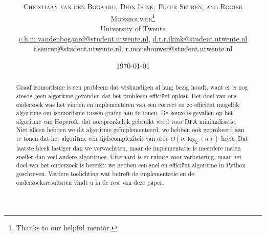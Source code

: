 \documentclass[twoside]{article}
\title{\vspace{-15mm}\fontsize{24pt}{10pt}\selectfont\textbf{\articletitle}} %
\author{
\large
\textsc{Christiaan van den Bogaard, Dion Ikink, Fleur Seuren, and Rogier Monshouwer}\thanks{Thanks to our helpful mentor.}\\[2mm] %
\normalsize University of Twente \\ %
\normalsize \href{mailto:c.h.m.vandenbogaard@student.utwente.nl}{c.h.m.vandenbogaard@student.utwente.nl},
\href{mailto:d.t.r.ikink@student.utwente.nl}{d.t.r.ikink@student.utwente.nl} \\
\normalsize\href{mailto:f.seuren@student.utwente.nl}{f.seuren@student.utwente.nl}, %
\href{mailto:r.monshouwer@student.utwente.nl}{r.monshouwer@student.utwente.nl}
}
\date{\today}
\begin{document}
\thispagestyle{empty}
\maketitle %


\begin{abstract}

Graaf isomorfisme is een probleem dat wiskundigen al lang bezig houdt, want er is nog steeds geen algoritme gevonden dat het probleem efficiënt oplost. Het doel van ons onderzoek was het vinden en implementeren van een correct en zo efficiënt mogelijk algoritme om isomorfisme tussen grafen aan te tonen. De keuze is gevallen op het algoritme van Hopcroft, dat oorspronkelijk gebruikt werd voor DFA minimalisatie. Niet alleen hebben we dit algoritme geïmplementeerd, we hebben ook geprobeerd aan te tonen dat het algoritme een tijdscomplexiteit van orde $O(m\log_{2}(n))$ heeft. Dat laatste bleek lastiger dan we verwachtten, maar de implementatie is meerdere malen sneller dan veel andere algoritmes. Uiteraard is er ruimte voor verbetering, maar het doel van het onderzoek is bereikt: we hebben een snel en efficiënt algoritme in Python geschreven. Verdere toelichting wat betreft de implementatie en de onderzoeksresultaten vindt u in de rest van deze paper.

\end{abstract}

\end{document}
